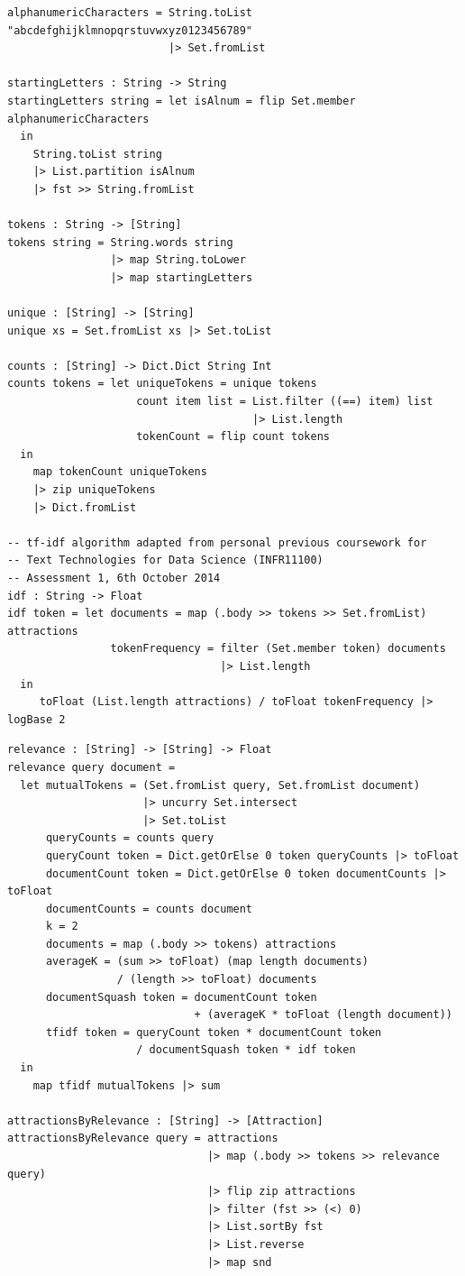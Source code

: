 \documentclass[12pt]{article}
\begin{document}
\begin{appendices}
\begin{verbatim}
alphanumericCharacters = String.toList "abcdefghijklmnopqrstuvwxyz0123456789"
                         |> Set.fromList 
  
startingLetters : String -> String
startingLetters string = let isAlnum = flip Set.member alphanumericCharacters
  in
    String.toList string  
    |> List.partition isAlnum
    |> fst >> String.fromList
  
tokens : String -> [String]
tokens string = String.words string 
                |> map String.toLower 
                |> map startingLetters

unique : [String] -> [String]
unique xs = Set.fromList xs |> Set.toList 

counts : [String] -> Dict.Dict String Int
counts tokens = let uniqueTokens = unique tokens
                    count item list = List.filter ((==) item) list 
                                      |> List.length
                    tokenCount = flip count tokens
  in
    map tokenCount uniqueTokens 
    |> zip uniqueTokens 
    |> Dict.fromList

-- tf-idf algorithm adapted from personal previous coursework for
-- Text Technologies for Data Science (INFR11100)
-- Assessment 1, 6th October 2014
idf : String -> Float
idf token = let documents = map (.body >> tokens >> Set.fromList) attractions
                tokenFrequency = filter (Set.member token) documents 
                                 |> List.length
  in 
     toFloat (List.length attractions) / toFloat tokenFrequency |> logBase 2
\end{verbatim}
\begin{samepage}
\begin{verbatim}
relevance : [String] -> [String] -> Float
relevance query document = 
  let mutualTokens = (Set.fromList query, Set.fromList document) 
                     |> uncurry Set.intersect 
                     |> Set.toList
      queryCounts = counts query
      queryCount token = Dict.getOrElse 0 token queryCounts |> toFloat
      documentCount token = Dict.getOrElse 0 token documentCounts |> toFloat
      documentCounts = counts document
      k = 2
      documents = map (.body >> tokens) attractions
      averageK = (sum >> toFloat) (map length documents) 
                 / (length >> toFloat) documents
      documentSquash token = documentCount token 
                             + (averageK * toFloat (length document))
      tfidf token = queryCount token * documentCount token 
                    / documentSquash token * idf token
  in
    map tfidf mutualTokens |> sum
    
attractionsByRelevance : [String] -> [Attraction]
attractionsByRelevance query = attractions
                               |> map (.body >> tokens >> relevance query)
                               |> flip zip attractions
                               |> filter (fst >> (<) 0)
                               |> List.sortBy fst
                               |> List.reverse 
                               |> map snd
\end{verbatim}
\end{samepage}

\end{appendices}
\end{document}
